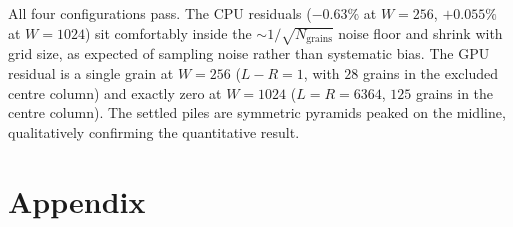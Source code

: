 \documentclass[oneside, a4paper, onecolumn, 11pt]{article}
\begin{document}
All four configurations pass. The CPU residuals ($-0.63\%$ at $W=256$,
$+0.055\%$ at $W=1024$) sit comfortably inside the
$\sim 1/\sqrt{N_{\text{grains}}}$ noise floor and shrink with grid size,
as expected of sampling noise rather than systematic bias. The GPU
residual is a single grain at $W=256$ ($L-R=1$, with $28$ grains in the
excluded centre column) and exactly zero at $W=1024$
($L=R=6364$, $125$ grains in the centre column). The settled piles
 are symmetric pyramids peaked on the midline,
qualitatively confirming the quantitative result.


\newpage



\newpage
\appendix

\section{Appendix}
\label{sec:appendix}
\end{document}
